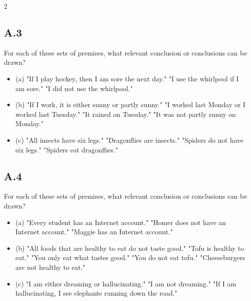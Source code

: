 \documentclass[9pt]{article}
\begin{document}
\begin{multicols}{2}
\subsection*{A.3}
For each of these sets of premises, what relevant conclusion or conclusions can be drawn?
\begin{itemize}
  \item (a) "If I play hockey, then I am sore the next day." "I use the whirlpool if I am sore." "I did not use the whirlpool."
  \item (b) "If I work, it is either sunny or partly sunny." "I worked last Monday or I worked last Tuesday." "It rained on Tuesday." "It was not partly sunny on Monday."
  \item (c) "All insects have six legs." "Dragonflies are insects." "Spiders do not have six legs." "Spiders eat dragonflies."
\end{itemize}

\subsection*{A.4}
For each of these sets of premises, what relevant conclusion or conclusions can be drawn?
\begin{itemize}
  \item (a) "Every student has an Internet account." "Homer does not have an Internet account." "Maggie has an Internet account."
  \item (b) "All foods that are healthy to eat do not taste good." "Tofu is healthy to eat." "You only eat what tastes good." "You do not eat tofu." "Cheeseburgers are not healthy to eat."
  \item (c) "I am either dreaming or hallucinating." "I am not dreaming." "If I am hallucinating, I see elephants running down the road."
\end{itemize}


\end{multicols}
\end{document}
